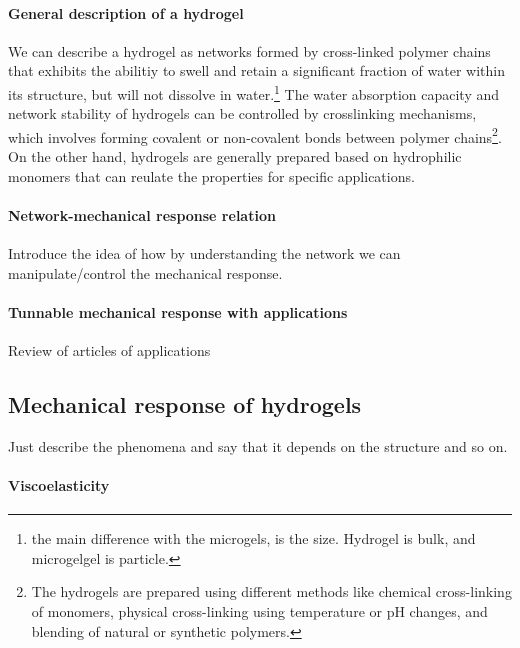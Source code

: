 \paragraph{General description of a hydrogel}
We can describe a hydrogel as networks formed by cross-linked polymer chains that exhibits the abilitiy to swell and retain a significant fraction of water within its structure, but will not dissolve in water\citep{ahmedHydrogelPreparationCharacterization2015a,ahmedHydrogelsMicrogelsDriving2025,priyaComprehensiveReviewHydrogel2024}.\footnote{the main difference with the microgels, is the size. Hydrogel is bulk, and microgelgel is particle.}
The water absorption capacity and network stability of hydrogels can be controlled by crosslinking mechanisms, which involves forming covalent or non-covalent bonds between polymer chains\footnote{The hydrogels are prepared using different methods like chemical cross-linking of monomers, physical cross-linking using temperature or pH changes, and blending of natural or synthetic polymers.}\citep{priyaComprehensiveReviewHydrogel2024,ahmedHydrogelPreparationCharacterization2015a}. 
On the other hand, hydrogels are generally prepared based on hydrophilic monomers that can reulate the properties for specific applications\citep{ahmedHydrogelPreparationCharacterization2015a,priyaComprehensiveReviewHydrogel2024}.

\paragraph{Network-mechanical response relation} Introduce the idea of how by understanding the network we can manipulate/control the mechanical response.

\paragraph{Tunnable mechanical response with applications} Review of articles of applications 

\subsection{Mechanical response of hydrogels}\label{ch1:Cross-linking}

Just describe the phenomena and say that it depends on the structure and so on.

\paragraph{Viscoelasticity}

